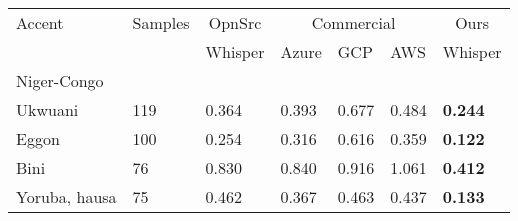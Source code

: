 \documentclass[11pt,a4paper]{article}
\begin{document}
\begin{table}
\tiny
\centering
\begin{tabular}{l|l|l|l|l|l|l}
\toprule 
Accent & Samples & \multicolumn{1}{c|}{OpnSrc} & \multicolumn{3}{c|}{Commercial} & \multicolumn{1}{c}{Ours} \\
   &  & Whisper & Azure & GCP & AWS & Whisper \\
\midrule
\multicolumn{7}{l}{Niger-Congo}\\
\hline
Ukwuani &      119 &                                                                                       0.364 &  0.393 &  0.677 &  0.484 &                                                                                            \textbf{0.244} \\
Eggon &      100 &                                                                                          0.254 &  0.316 &  0.616 &  0.359 &                                                                                            \textbf{0.122} \\
Bini          &     76 &                                                                                         0.830 &  0.840 &  0.916 &  1.061 &                                                                                           \textbf{0.412} \\
Yoruba, hausa &      75 &                                                                                       0.462 &  0.367 &  0.463 &  0.437 &                                                                                         \textbf{0.133} \\


\end{tabular}
\end{table}
\end{document}
